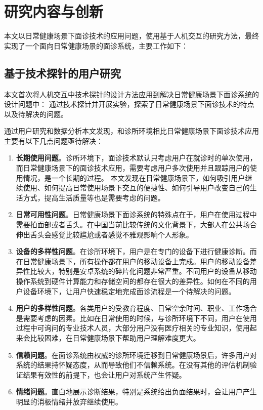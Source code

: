 \section{研究内容与创新}

本文以日常健康场景下面诊技术的应用问题，使用基于人机交互的研究方法，最终实现了一个面向日常健康场景的面诊系统，主要工作如下：

\subsection{基于技术探针的用户研究}

本文首次将人机交互中技术探针的设计方法应用到解决日常健康场景下面诊系统的设计问题中：
通过技术探针并开展实验，探索了日常健康场景下面诊技术的特点以及待解决的问题。

通过用户研究和数据分析本文发现，和诊所环境相比日常健康场景下面诊技术应用主要有以下几点问题亟待解决：
\begin{enumerate}
    \item \textbf{长期使用问题}。诊所环境下，面诊技术默认只考虑用户在就诊时的单次使用，而日常健康场景下的面诊技术应用，需要考虑用户多次使用并且跟踪用户的使用情况，是一个长期的过程。
    本文发现在日常健康场景下，如何吸引用户继续使用、如何提高日常使用场景下交互的便捷性、如何引导用户改变自己的生活方式，提高生活质量等也是需要考虑的问题。
    
    \item \textbf{日常可用性问题}。日常健康场景下面诊系统的特殊点在于，用户在使用过程中需要拍面部或者舌头。在中国当前比较传统的文化背景下，大部人在公共场合伸出舌头会感觉比较尴尬或者感觉不雅观影响个人形象。

    \item \textbf{设备的多样性问题}。在诊所环境下，用户是在专门的设备下进行健康诊断。而在日常健康场景下，所有操作都在用户的移动设备上完成。用户的移动设备差异性比较大，特别是安卓系统的碎片化问题非常严重。不同用户的设备从移动操作系统到硬件计算能力和存储空间的都存在很大的差异性。如何在不同的用户设备环境下，让用户快速稳定地完成面诊流程是一个待解决的问题。
    
    \item \textbf{用户的多样性问题}。各类用户的受教育程度、日常空余时间、职业、工作场合是需要考虑的因素。比如在日常使用的时候，与诊所环境下不同，用户在使用过程中可询问的专业技术人员，大部分用户没有医疗相关的专业知识，使用起来会比较困难，在日常健康场景下帮助用户理解难度更大。
        
    \item \textbf{信赖问题}。在面诊系统由权威的诊所环境迁移到日常健康场景后，许多用户对系统的结果持怀疑态度，从而导致他们不信赖系统。在没有其他的评估机制验证结果有效性的前提下，也会让用户对系统产生怀疑。
    
    \item \textbf{情绪问题}。直白地展示诊断结果，特别是系统给出负面结果时，会让用户产生明显的消极情绪并放弃继续使用。
\end{enumerate}

